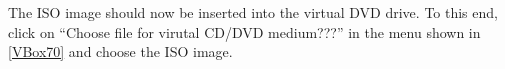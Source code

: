 \documentclass[a4paper,10pt,BCOR=0mm,DIV=14]{scrartcl}
\newcommand{\command}[1]{\textsf{\enquote{#1}}}
\begin{document}

The ISO image should now be inserted into the virtual DVD drive. To this end, click on \command{Choose file for virutal CD/DVD medium???} in the menu shown in \cref{VBox70} and choose the ISO image. 

\end{document}
